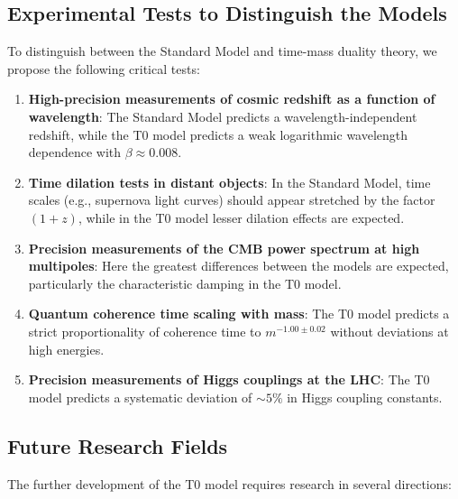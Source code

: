 \documentclass{article}
\theoremstyle{definition}
\theoremstyle{remark}
\begin{document}
	\subsection{Experimental Tests to Distinguish the Models}
	
	To distinguish between the Standard Model and time-mass duality theory, we propose the following critical tests:
	
	\begin{enumerate}
		\item \textbf{High-precision measurements of cosmic redshift as a function of wavelength}: The Standard Model predicts a wavelength-independent redshift, while the T0 model predicts a weak logarithmic wavelength dependence with $\beta \approx 0.008$.
		
		\item \textbf{Time dilation tests in distant objects}: In the Standard Model, time scales (e.g., supernova light curves) should appear stretched by the factor $(1+z)$, while in the T0 model lesser dilation effects are expected.
		
		\item \textbf{Precision measurements of the CMB power spectrum at high multipoles}: Here the greatest differences between the models are expected, particularly the characteristic damping in the T0 model.
		
		\item \textbf{Quantum coherence time scaling with mass}: The T0 model predicts a strict proportionality of coherence time to $m^{-1.00 \pm 0.02}$ without deviations at high energies.
		
		\item \textbf{Precision measurements of Higgs couplings at the LHC}: The T0 model predicts a systematic deviation of $\sim 5\%$ in Higgs coupling constants.
	\end{enumerate}
	
	\subsection{Future Research Fields}
	
	The further development of the T0 model requires research in several directions:
	
\end{document}

